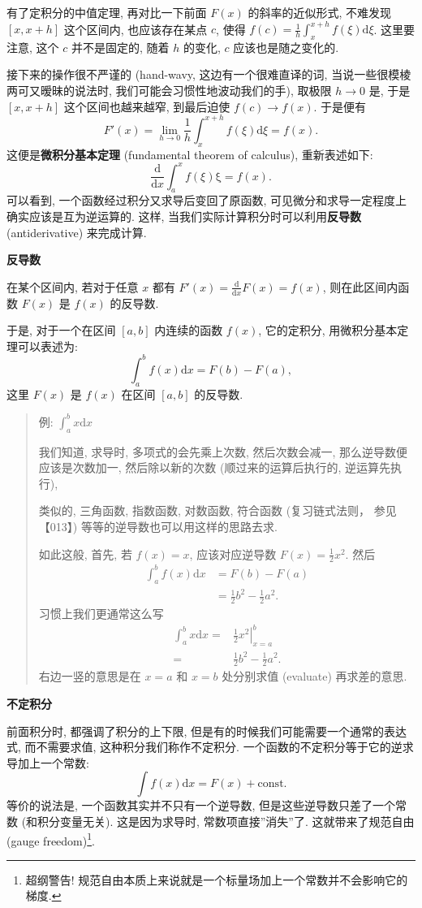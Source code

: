 有了定积分的中值定理, 再对比一下前面 \(F(x)\) 的斜率的近似形式, 不难发现
\([x,x+h]\) 这个区间内, 也应该存在某点 \(c\), 使得
\(f(c)=\frac{1}{h}\int_x^{x+h}f(\xi)\mathrm{d}\xi\). 这里要注意, 这个
\(c\) 并不是固定的, 随着 \(h\) 的变化, \(c\) 应该也是随之变化的.

接下来的操作很不严谨的 (hand-wavy, 这边有一个很难直译的词,
当说一些很模棱两可又暧昧的说法时, 我们可能会习惯性地波动我们的手),
取极限 \(h\rightarrow0\) 是, 于是 \([x,x+h]\) 这个区间也越来越窄,
到最后迫使 \(f(c)\rightarrow f(x)\). 于是便有 \[
F'(x)=\lim_{h\rightarrow 0}\frac{1}{h}\int_x^{x+h}f(\xi)\mathrm{d}\xi=f(x).
\] 这便是\textbf{微积分基本定理} (fundamental theorem of calculus),
重新表述如下: \[
\boxed{\frac{\mathrm{d}}{\mathrm{d}x}\int_a^xf(\xi)\mathrm{\xi}=f(x).}
\] 可以看到, 一个函数经过积分又求导后变回了原函数,
可见微分和求导一定程度上确实应该是互为逆运算的. 这样,
当我们实际计算积分时可以利用\textbf{反导数 }(antiderivative) 来完成计算.

\textbf{反导数}

在某个区间内, 若对于任意 \(x\) 都有
\(F'(x)=\frac{\mathrm{d}}{\mathrm{d}x}F(x)=f(x)\), 则在此区间内函数
\(F(x)\) 是 \(f(x)\) 的反导数.

于是, 对于一个在区间 \([a,b]\) 内连续的函数 \(f(x)\), 它的定积分,
用微积分基本定理可以表述为: \[
\boxed{\int_a^bf(x)\mathrm{d}x=F(b)-F(a),}
\] 这里 \(F(x)\) 是 \(f(x)\) 在区间 \([a,b]\) 的反导数.

\begin{quote}
例: \(\int_a^b x\mathrm{d}x\)

我们知道, 求导时, 多项式的会先乘上次数, 然后次数会减一,
那么逆导数便应该是次数加一, 然后除以新的次数 (顺过来的运算后执行的,
逆运算先执行),

类似的, 三角函数, 指数函数, 对数函数, 符合函数 (复习链式法则，
参见【013】) 等等的逆导数也可以用这样的思路去求.

如此这般, 首先, 若 \(f(x)=x\), 应该对应逆导数 \(F(x)=\frac{1}{2}x^2\).
然后 \[
\begin{aligned}
  \int_a^bf(x)\mathrm{d}x&=F(b)-F(a)\\
  &=\frac{1}{2}b^2-\frac{1}{2}a^2.
\end{aligned}
\] 习惯上我们更通常这么写 \[
\begin{aligned}
\int_a^bx\mathrm{d}x=&\left.\frac{1}{2}x^2\right|_{x=a}^b\\
=&\frac{1}{2}b^2-\frac{1}{2}a^2.
\end{aligned}
\] 右边一竖的意思是在 \(x=a\) 和 \(x=b\) 处分别求值 (evaluate)
再求差的意思.
\end{quote}

\textbf{不定积分}

前面积分时, 都强调了积分的上下限,
但是有的时候我们可能需要一个通常的表达式, 而不需要求值,
这种积分我们称作不定积分. 一个函数的不定积分等于它的逆求导加上一个常数:
\[
\int f(x)\mathrm{d}x=F(x)+\text{const.}
\] 等价的说法是, 一个函数其实并不只有一个逆导数,
但是这些逆导数只差了一个常数 (和积分变量无关). 这是因为求导时,
常数项直接''消失''了. 这就带来了规范自由 (gauge freedom)\footnote{超纲警告!
  规范自由本质上来说就是一个标量场加上一个常数并不会影响它的梯度.}.
